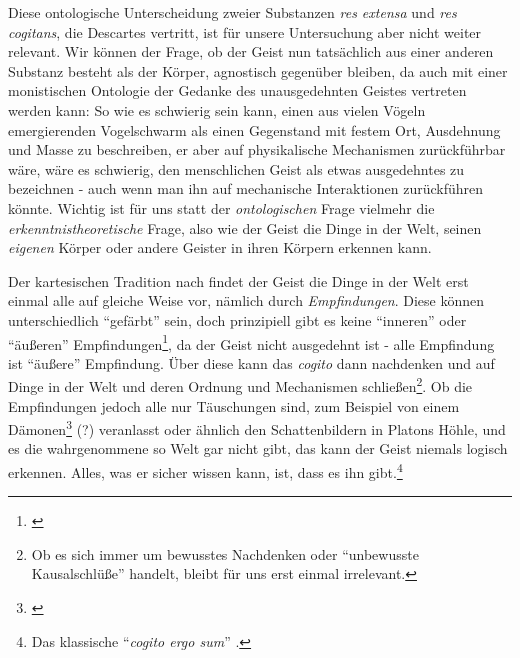 \documentclass[a4paper, 12pt]{article}
\begin{document}
\begin{onehalfspace}
Diese ontologische Unterscheidung zweier Substanzen \emph{res extensa} und \emph{res cogitans}, die Descartes vertritt, ist für unsere Untersuchung aber nicht weiter relevant. Wir können der Frage, ob der Geist nun tatsächlich aus einer anderen Substanz besteht als der Körper, agnostisch gegenüber bleiben, da auch mit einer monistischen Ontologie der Gedanke des unausgedehnten Geistes vertreten werden kann: So wie es schwierig sein kann, einen aus vielen Vögeln emergierenden Vogelschwarm als einen Gegenstand mit festem Ort, Ausdehnung und Masse zu beschreiben, er aber auf physikalische Mechanismen zurückführbar wäre, wäre es schwierig, den menschlichen Geist als etwas ausgedehntes zu bezeichnen - auch wenn man ihn auf mechanische Interaktionen zurückführen könnte. Wichtig ist für uns statt der \emph{ontologischen} Frage vielmehr die \emph{erkenntnistheoretische} Frage, also wie der Geist die Dinge in der Welt, seinen \emph{eigenen} Körper oder andere Geister in ihren Körpern erkennen kann.


Der kartesischen Tradition nach findet der Geist die Dinge in der Welt erst einmal alle auf gleiche Weise vor, nämlich durch \emph{Empfindungen}. Diese können unterschiedlich "`gefärbt"' sein, doch prinzipiell gibt es keine "`inneren"' oder "`äußeren"' Empfindungen\footnote{\Cite[Vgl.][S. ?? (501?)]{scheler-ethik}}, da der Geist nicht ausgedehnt ist - alle Empfindung ist "`äußere"' Empfindung. Über diese kann das \emph{cogito} dann nachdenken und auf Dinge in der Welt und deren Ordnung und Mechanismen schließen\footnote{Ob es sich immer um bewusstes Nachdenken oder "`unbewusste Kausalschlüße"' handelt, bleibt für uns erst einmal irrelevant.}. Ob die Empfindungen jedoch alle nur Täuschungen sind, zum Beispiel von einem Dämonen\footnote{\Cite[Vgl.][S.?]{descartes}} (?) veranlasst oder ähnlich den Schattenbildern in Platons Höhle, und es die wahrgenommene so Welt gar nicht gibt, das kann der Geist niemals logisch erkennen. Alles, was er sicher wissen kann, ist, dass es ihn gibt.\footnote{Das klassische "`\emph{cogito ergo sum}"' .}




\end{onehalfspace}
\end{document}
